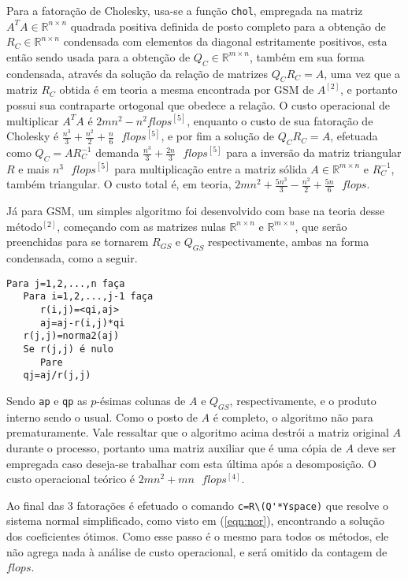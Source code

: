 \documentclass[a4paper, 12pt]{article}
\newcommand*\R{\mathbb{R}}
\begin{document}
Para a fatoração de Cholesky, usa-se a função \verb+chol+, empregada na matriz $A^TA\in \R^{n\times n}$ quadrada positiva definida de posto completo para a obtenção de $R_C\in \R^{n\times n}$ condensada com elementos da diagonal estritamente positivos, esta então sendo usada para a obtenção de $Q_C\in \R^{m\times n}$, também em sua forma condensada, através da solução da relação de matrizes $Q_CR_C=A$, uma vez que a matriz $R_C$ obtida é em teoria a mesma encontrada por GSM de $A^{[2]}$, e portanto possui sua contraparte ortogonal que obedece a relação. O custo operacional de multiplicar $A^TA$ é $2mn^2-n^2 flops^{[5]}$, enquanto o custo de sua fatoração de Cholesky é $\frac{n^3}{3}+\frac{n^2}{2}+\frac{n}{6}\text{ }flops^{[5]}$, e por fim a solução de $Q_CR_C=A$, efetuada como $Q_C=AR_C^{-1}$ demanda $\frac{n^3}{3}+\frac{2n}{3}\text{ }flops^{[5]}$ para a inversão da matriz triangular $R$ e mais $n^3\text{ }flops^{[5]}$ para multiplicação entre a matriz sólida $A\in \R^{m\times n}$ e $R_C^{-1}$, também triangular. O custo total é, em teoria, $2mn^2+\frac{5n^3}{3}-\frac{n^2}{2}+\frac{5n}{6}\text{ }flops$.

Já para GSM, um simples algoritmo foi desenvolvido com base na teoria desse método$^{[2]}$, começando com as matrizes nulas $\R^{n\times n}$ e $\R^{m\times n}$, que serão preenchidas para se tornarem $R_{GS}$ e $Q_{GS}$ respectivamente, ambas na forma condensada, como a seguir.
\begin{verbatim}
Para j=1,2,...,n faça
   Para i=1,2,...,j-1 faça
      r(i,j)=<qi,aj>
      aj=aj-r(i,j)*qi
   r(j,j)=norma2(aj)
   Se r(j,j) é nulo
      Pare
   qj=aj/r(j,j) 
\end{verbatim}
Sendo \verb+ap+ e \verb+qp+ as $p$-ésimas colunas de $A$ e $Q_{GS}$, respectivamente, e o produto interno sendo o usual. Como o posto de $A$ é completo, o algoritmo não para prematuramente. Vale ressaltar que o algoritmo acima destrói a matriz original $A$ durante o processo, portanto uma matriz auxiliar que é uma cópia de $A$ deve ser empregada caso deseja-se trabalhar com esta última após a desomposição. O custo operacional teórico é $2mn^2+mn\text{ }flops^{[4]}$.

Ao final das 3 fatorações é efetuado o comando \verb+c=R\(Q'*Yspace)+ que resolve o sistema normal simplificado, como visto em (\ref{eqn:nor}), encontrando a solução dos coeficientes ótimos. Como esse passo é o mesmo para todos os métodos, ele não agrega nada à análise de custo operacional, e será omitido da contagem de $flops$.
\end{document}
